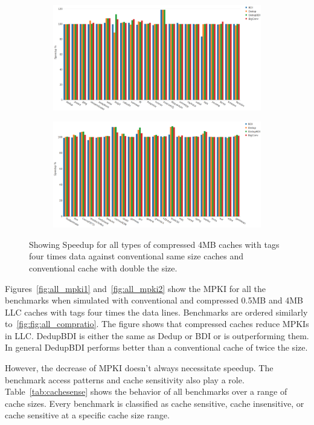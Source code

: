 \begin{figure}
    \begin{subfigure}{\textwidth}
        \includegraphics[width=\textwidth]{all4-speedup1.png}
    \end{subfigure}
    \begin{subfigure}{\textwidth}
        \includegraphics[width=\textwidth]{all4-speedup2.png}
    \end{subfigure}
    \caption[All benchmarks: 0.5MB Speedup]{Showing Speedup for all types of compressed 4MB caches with tags four times data against conventional same size caches and conventional cache with double the size.}
    \label{fig:all_speedup2}
\end{figure}
Figures~\ref{fig:all_mpki1} and~\ref{fig:all_mpki2} show the MPKI for all the benchmarks when simulated with conventional and compressed 0.5MB and 4MB LLC caches with tags four times the data lines. Benchmarks are ordered similarly to~\ref{fig:fig:all_compratio}. The figure shows that compressed caches reduce MPKIs in LLC. DedupBDI is either the same as Dedup or BDI or is outperforming them. In general DedupBDI performs better than a conventional cache of twice the size.\par
However, the decrease of MPKI doesn't always necessitate speedup. The benchmark access patterns and cache sensitivity also play a role. Table~\ref{tab:cachesense} shows the behavior of all benchmarks over a range of cache sizes. Every benchmark is classified as cache sensitive, cache insensitive, or cache sensitive at a specific cache size range.
